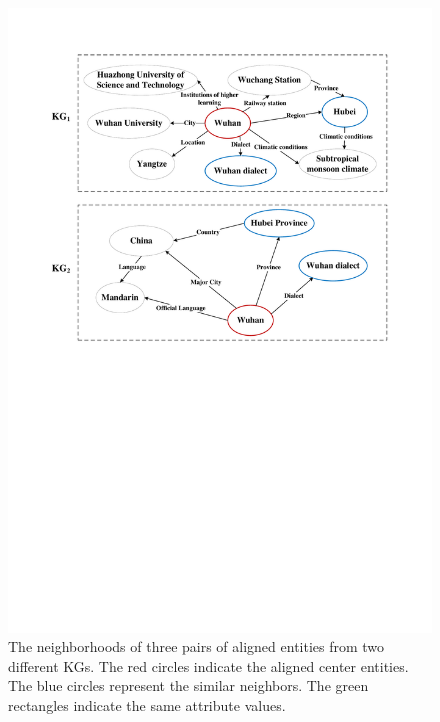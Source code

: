 	\begin{figure}
		\begin{center}
			\includegraphics[width=1\linewidth]{figures/graph1.pdf}
			\caption{The neighborhoods of three pairs of aligned entities from two different KGs. The red circles indicate the aligned center entities. The blue circles represent the similar neighbors. The green rectangles indicate the same attribute values.}
			\label{Wuhan}
		\end{center}
	\end{figure}
	
